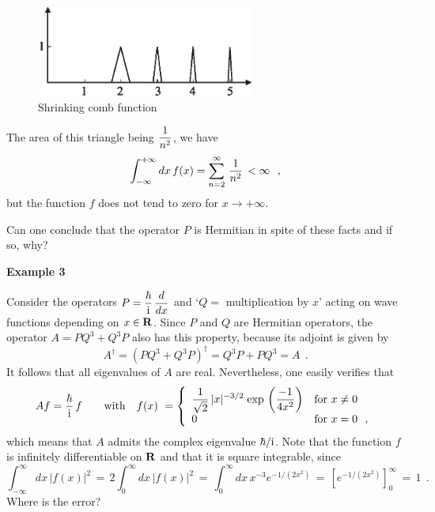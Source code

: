 \documentclass[a4wide,12pt]{report}
\begin{document}
\bigskip 

\begin{figure}[h!]
\centerline{\includegraphics*[height=3cm,angle=0]{dessin2.eps}}
\caption{Shrinking comb function}
\end{figure}

\bigskip


\noindent 
The area
of this triangle being $\displaystyle{1 \over n^2}$,
we have
\[
\int_{-\infty}^{+\infty} dx \, f(x)  =
\sum_{n=2}^{\infty} \, \displaystyle{1 \over n^2} \, < \infty
\ \ ,
\]
but the function
$f$ does not tend to zero for $x \to +\infty$.


\noindent 
Can one conclude that the operator $P$ is Hermitian
in spite of these facts and if so, why?
 
\bigskip
 

\noindent 
{\bf Example 3}
 
\medskip

Consider the operators
$P= \displaystyle{\hbar \over {\rm i}} \, \displaystyle{d \over dx}$ and `$Q=$ multiplication by
$x$' acting on wave functions depending on
$x \in {\bf R}$.
Since $P$ and $Q$ are Hermitian operators, the operator
$A =  PQ^3 +Q^3 P$
also has this property, because its adjoint is given by
\[
A^{\dag} = ( PQ^3 +Q^3 P )^{\dag} =
Q^3 P + PQ^3 = A
\ \ .
\]
It follows that all eigenvalues of $A$ are real.
Nevertheless, one easily verifies that
\begin{equation}
\label{fon}
Af = \displaystyle{\hbar \over {\rm i}} \, f
\qquad {\rm with} \quad
f(x) \ =
\left\{
\begin{array}{ll}
\displaystyle{1\over \sqrt{2}} \, |x|^{-3/2} \; {\rm exp} \,
\left( {-1 \over 4x^2} \right)
& {\rm for} \ x \neq 0
\\
0
& {\rm for} \ x = 0 \ \ ,
\end{array}
\right.
\end{equation}
which means that $A$ admits the complex eigenvalue
$\hbar / {\rm i}$.
Note that the function $f$ is infinitely differentiable on
${\bf R}$ and that it is square integrable, since
\[
\int_{-\infty}^{\infty} dx \, |f(x)|^2 \, = \, 2
\int_0^{\infty} dx \, |f(x)|^2 \, = \,
\int_0^{\infty} dx \, x^{-3} e^{-1/(2x^2)} \, = \,
\left[
e^{-1/(2x^2)} \right]_0^{\infty} \, = \, 1
\ \ .
\]
Where is the error?
 
\end{document}
